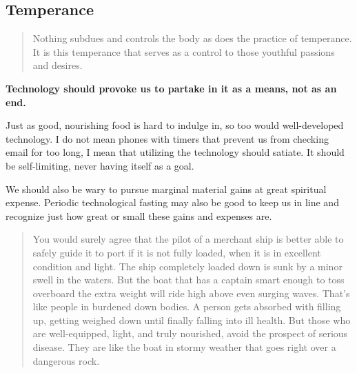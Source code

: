 \documentclass[letterpaper]{article}
\begin{document}
\hfill

\hfill

\hfill

\hfill

\hfill

\hfill

\hfill

\hfill

\hfill

\subsection{Temperance}

\begin{quote}
  Nothing subdues and controls the body as does the practice of temperance. It is this temperance that serves as a control to those youthful passions and desires.
\end{quote}

\textbf{Technology should provoke us to partake in it as a means, not as an end.} 

Just as good, nourishing food is hard to indulge in, so too would well-developed technology. I do not mean phones with timers that prevent us from checking email for too long, I mean that utilizing the technology should satiate. It should be self-limiting, never having itself as a goal.

We should also be wary to pursue marginal material gains at great spiritual expense. Periodic technological fasting may also be good to keep us in line and recognize just how great or small these gains and expenses are.

\begin{quote}
  You would surely agree that the pilot of a merchant ship is better able to safely guide it to port if it is not fully loaded, when it is in excellent condition and light. The ship completely loaded down is sunk by a minor swell in the waters. But the boat that has a captain smart enough to toss overboard the extra weight will ride high above even surging waves.
  That’s like people in burdened down bodies. A person gets absorbed with filling up, getting weighed down until finally falling into ill health. But those who are well-equipped, light, and truly nourished, avoid the prospect of serious disease. They are like the boat in stormy weather that goes right over a dangerous rock.
\end{quote}
\end{document}
